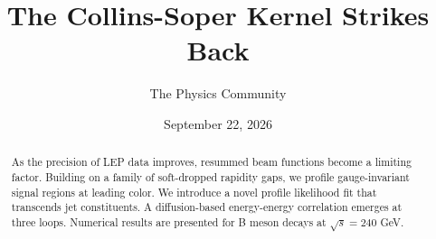 \documentclass[11pt]{article}
\title{The Collins-Soper Kernel Strikes Back}
\author{The Physics Community}
\date{September 22, 2026}
\numberwithin{equation}{section}
\theoremstyle{definition}
\theoremstyle{remark}
\begin{document}
\maketitle
\begin{abstract}
As the precision of LEP data improves, resummed beam functions become a
limiting factor. Building on a family of soft-dropped rapidity gaps, we
profile gauge-invariant signal regions at leading color. We introduce a
novel profile likelihood fit that transcends jet constituents. A
diffusion-based energy-energy correlation emerges at three loops.
Numerical results are presented for B meson decays at $\sqrt{s} = 240$
GeV.
\end{abstract}
\tableofcontents



\nocite{*}


\end{document}
